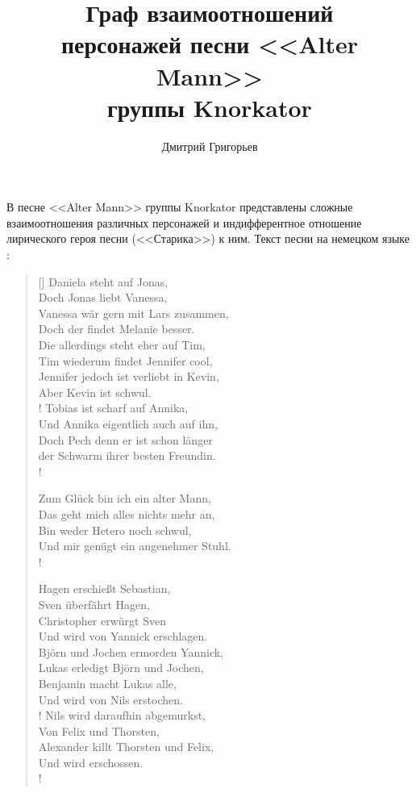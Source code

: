 \documentclass[a4paper,12pt,notitlepage]{article}
\author{Дмитрий Григорьев}
\title{Граф взаимоотношений\\персонажей песни <<Alter Mann>>\\группы Knorkator}
\begin{document}
  \maketitle
  В песне <<Alter Mann>> группы Knorkator представлены сложные взаимоотношения различных персонажей и индифферентное отношение лирического героя песни (<<Старика>>) к ним. Текст песни на немецком языке \cite{knorkator01}:
  
  \settowidth{\versewidth}{Doch Pech denn er ist schon länger}
  \begin{verse}[\versewidth]
	  Daniela steht auf Jonas, \\
	  Doch Jonas liebt Vanessa, \\
		Vanessa wär gern mit Lars zusammen, \\
		Doch der findet Melanie besser. \\
		Die allerdings steht eher auf Tim, \\
		Tim wiederum findet Jennifer cool, \\
		Jennifer jedoch ist verliebt in Kevin, \\
		Aber Kevin ist schwul. \\!
		Tobias ist scharf auf Annika, \\
		Und Annika eigentlich auch auf ihn, \\
		Doch Pech denn er ist schon länger \\
		der Schwarm ihrer besten Freundin. \\!


		Zum Glück bin ich ein alter Mann, \\
		Das geht mich alles nichts mehr an, \\
		Bin weder Hetero noch schwul, \\
		Und mir genügt ein angenehmer Stuhl. \\!

		Hagen erschießt Sebastian, \\
		Sven überfährt Hagen, \\
		Christopher erwürgt Sven \\
		Und wird von Yannick erschlagen. \\
		Björn und Jochen ermorden Yannick, \\
		Lukas erledigt Björn und Jochen, \\
		Benjamin macht Lukas alle, \\
		Und wird von Nils erstochen. \\!
		Nils wird daraufhin abgemurkst, \\
		Von Felix und Thorsten, \\
		Alexander killt Thorsten und Felix, \\
		Und wird erschossen. \\!


\end{verse}
\end{document}
